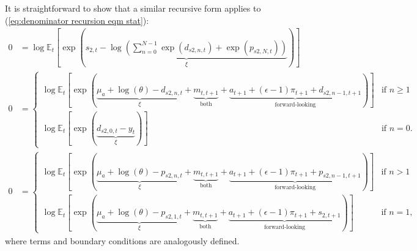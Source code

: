 \documentclass[12 pt, oneside]{article}
\theoremstyle{definition}
\theoremstyle{definition}
\theoremstyle{definition}
\newcommand{\E}{\mathbb{E}}
\begin{document}
It is straightforward to show that a similar recursive form applies to (\ref{eq:denominator recursion eqm stat}):
\begin{align}
  0 & = \log\E_t\left[\exp\left(\underbrace{s_{2, t} - \log\left(\sum_{n = 0}^{N - 1}\exp(d_{s2, n, t}) + \exp(p_{s2, N, t})\right)}_{\xi}\right)\right]\\
  0 & =
      \begin{cases}
        \log\E_t\left[\exp\left(\underbrace{\mu_a + \log(\theta) - d_{s2, n, t}}_{\xi} + \underbrace{m_{t, t + 1}}_{\text{both}} + \underbrace{a_{t + 1} + (\epsilon - 1) \pi_{t + 1} + d_{s2, n - 1, t + 1}}_{\text{forward-looking}}\right)\right] & \text{if } n \geq 1\\
        \log\E_t\left[\exp\left(\underbrace{d_{s2, 0, t} - y_t}_{\xi}\right)\right] & \text{if } n = 0.
      \end{cases}\\
  0 & =
      \begin{cases}
        \log\E_t\left[\exp\left(\underbrace{\mu_a + \log(\theta) - p_{s2, n, t}}_{\xi} + \underbrace{m_{t, t + 1}}_{\text{both}} + \underbrace{a_{t + 1} + (\epsilon - 1) \pi_{t + 1} + p_{s2, n - 1, t + 1}}_{\text{forward-looking}} \right)\right] & \text{if } n > 1\\
        \log\E_t\left[\exp\left(\underbrace{\mu_a + \log(\theta) - p_{s2, 1, t}}_{\xi} + \underbrace{m_{t, t + 1}}_{\text{both}} + \underbrace{a_{t + 1} + (\epsilon - 1)\pi_{t + 1} + s_{2, t + 1}}_{\text{forward-looking}}\right)\right] & \text{if } n = 1,
      \end{cases}
\end{align}
where terms and boundary conditions are analogously defined.
\end{document}
